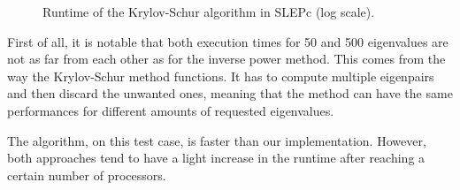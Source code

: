 \begin{figure}[H]
  \centering
  
  \caption{Runtime of the Krylov-Schur algorithm in SLEPc (log scale).}
\end{figure}

First of all, it is notable that both execution times for 50 and 500 eigenvalues are not as far from each other as for the inverse power method.
This comes from the way the Krylov-Schur method functions.
It has to compute multiple eigenpairs and then discard the unwanted ones, meaning that the method can have the same performances for different amounts of requested eigenvalues.

The algorithm, on this test case, is faster than our implementation.
However, both approaches tend to have a light increase in the runtime after reaching a certain number of processors.
